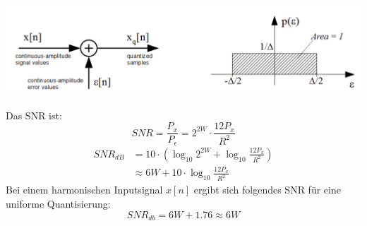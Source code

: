 \begin{center}
	\includegraphics[width=.9\textwidth]{../fig/quantization_noise}
\end{center}
Das SNR ist:
\[ SNR = \frac{P_x}{P_\epsilon} = 2^{2W} \cdot \frac{12P_x}{R^2} \]
\[\begin{aligned} SNR_{dB} &= 10 \cdot \left( \log_{10}2^{2W} +
	 \log_{10}\frac{12P_x}{R^2} \right)\\
	 &\approx 6W + 10 \cdot \log_{10}\frac{12P_x}{R^2} 
\end{aligned}\]
Bei einem harmonischen Inputsignal $x[n]$ ergibt sich folgendes SNR für
eine uniforme Quantisierung:
\[ SNR_{db} = 6W +1.76 \approx 6W \]

